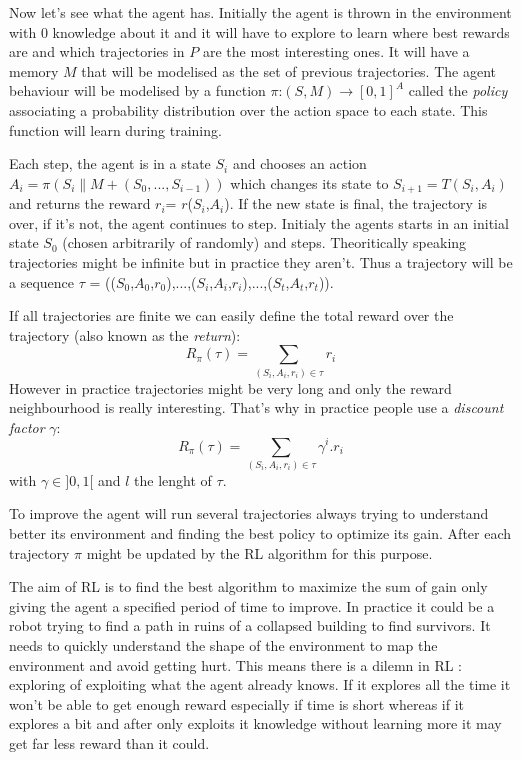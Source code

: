 \documentclass[11pt]{article}
\begin{document}
Now let's see what the agent has. Initially the agent is thrown in the environment with 0 knowledge about it and it will have to explore to learn where best rewards are and which trajectories in $P$ are the most interesting ones. It will have a memory $M$ that will be modelised as the set of previous trajectories. The agent behaviour will be modelised by a function $\pi$:$(S,M)\rightarrow [0,1]^A$ called the \emph{policy} associating a probability distribution over the action space to each state. This function will learn during training.

Each step, the agent is in a state $S_i$ and chooses an action $A_{i} = \pi(S_i\|M+(S_0,...,S_{i-1}))$ which changes its state to $S_{i+1}=T(S_i,A_i)$ and returns the reward $r_i$= $r$($S_i$,$A_i$). If the new state is final, the trajectory is over, if it's not, the agent continues to step. Initialy the agents starts in an initial state $S_0$ (chosen arbitrarily of randomly) and steps. Theoritically speaking trajectories might be infinite but in practice they aren't. Thus a trajectory will be a sequence $\tau$ = (($S_0$,$A_0$,$r_0$),...,($S_i$,$A_i$,$r_i$),...,($S_t$,$A_t$,$r_t$)).

If all trajectories are finite we can easily define the total reward over the trajectory (also known as the \emph{return}): $$ R_{\pi}(\tau)= \sum_{(S_i,A_i,r_i)\in\tau}r_i$$
However in practice trajectories might be very long and only the reward neighbourhood is really interesting. That's why in practice people use a \emph{discount factor} $\gamma$:
$$ R_{\pi}(\tau) = \sum_{(S_i,A_i,r_i)\in\tau}\gamma^{i}.r_i $$
with $\gamma\in]0,1[$ and $l$ the lenght of $\tau$.

To improve the agent will run several trajectories always trying to understand better its environment and finding the best policy to optimize its gain. After each trajectory $\pi$ might be updated by the RL algorithm for this purpose.

The aim of RL is to find the best algorithm to maximize the sum of gain only giving the agent a specified period of time to improve. In practice it could be a robot trying to find a path in ruins of a collapsed building to find survivors. It needs to quickly understand the shape of the environment to map the environment and avoid getting hurt. This means there is a dilemn in RL : exploring of exploiting what the agent already knows. If it explores all the time it won't be able to get enough reward especially if time is short whereas if it explores a bit and after only exploits it knowledge without learning more it may get far less reward than it could.
\end{document}
